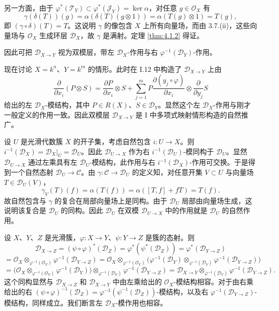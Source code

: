 另一方面，由于 $\varphi^*(\mathcal{T}_Y)\subset\varphi^*(\mathcal{J}_Y)=\ker\alpha$，对任意 $g\in\mathcal{O}_X$ 有
$$\gamma(\delta(T))(g)=\alpha(\delta(T)(g\otimes 1))=\alpha(T(g)\otimes 1)=T(g),$$
即 $(\gamma\circ\delta)(T)=T$。这说明 $\gamma$ 的像包含 $X$ 上所有向量场，而由 3.7.(ii)，这些向量场与 $\mathcal{O}_X$ 生成环层 $\mathcal{D}_X$，故 $\gamma$ 是满射。定理 \ref{thm:4.1.2} 得证。

因此可把 $\mathcal{D}_{X\to Y}$ 视为双模层，带左 $\mathcal{D}_X$-作用与右 $\varphi^{-1}(\mathcal{D}_Y)$-作用。

现在讨论 $X=k^n$、$Y=k^m$ 的情形。此时在 I.12 中构造了 $\mathcal{D}_{X\to Y}$ 上由
$$\frac{\partial}{\partial x_i}(P\otimes S)=\frac{\partial P}{\partial x_i}\otimes S
+\sum_{j=1}^m P\frac{\partial(y_j\circ\varphi)}{\partial x_i}\otimes\frac{\partial}{\partial y_j}S$$
给出的左 $\mathcal{D}_X$-模结构，其中 $P\in R(X)$、$S\in\mathcal{D}_Y$。显然这个左 $\mathcal{D}_X$-作用与刚才一般定义的作用一致。因此双模层 $\mathcal{D}_{X\to Y}$ 是 I 中多项式映射情形构造的自然推广。

\begin{remark}\label{rem:4.1.6}
设 $U$ 是光滑代数簇 $X$ 的开子集，考虑自然包含 $i:U\to X$。则
$i^{-1}(\mathcal{D}_X)=\mathcal{D}_X|_U=\mathcal{D}_U$。因此 $\mathcal{D}_{U\to X}$ 作为右 $i^{-1}(\mathcal{D}_U)$-模同构于 $\mathcal{D}_U$。显然 $\mathcal{D}_{U\to X}$ 通过左乘具有左 $\mathcal{D}_U$-模结构，此作用与右 $i^{-1}(\mathcal{D}_X)$-作用可交换。于是得到一个自然态射 $\mathcal{D}_U\to\mathcal{C}$。由 $\gamma:\mathcal{C}\to\mathcal{D}_U$ 的定义知，对任意开集 $V\subset U$ 与向量场 $T\in\mathcal{D}_U(V)$，
$$\gamma_V(T)(f)=\alpha(T(f))=\alpha([T,f]+fT)=T(f).$$
故自然包含与 $\gamma$ 的复合在局部向量场上是同构。由于 $\mathcal{D}_U$ 局部由向量场生成，这说明该复合是 $\mathcal{D}_U$ 的同构。因此 $\mathcal{D}_U$ 在双模 $\mathcal{D}_{U\to X}$ 中的作用就是 $\mathcal{D}_U$ 的自然作用。
\end{remark}

设 $X$、$Y$、$Z$ 是光滑簇，$\varphi:X\to Y$、$\psi:Y\to Z$ 是簇的态射。则
$$\mathcal{D}_{X\to Z}=(\psi\circ\varphi)^*(\mathcal{D}_Z)=\varphi^*(\psi^*(\mathcal{D}_Z))
=\varphi^*(\mathcal{D}_{Y\to Z})$$
$$=\mathcal{O}_X\otimes_{\varphi^{-1}(\mathcal{O}_Y)}\varphi^{-1}(\mathcal{D}_{Y\to Z})
=\mathcal{O}_X\otimes_{\varphi^{-1}(\mathcal{O}_Y)}\bigl(\varphi^{-1}(\mathcal{D}_Y)
\otimes_{\varphi^{-1}(\mathcal{D}_Y)}\varphi^{-1}(\mathcal{D}_{Y\to Z})\bigr)$$
$$=\bigl(\mathcal{O}_X\otimes_{\varphi^{-1}(\mathcal{O}_Y)}\varphi^{-1}(\mathcal{D}_Y)\bigr)
\otimes_{\varphi^{-1}(\mathcal{D}_Y)}\varphi^{-1}(\mathcal{D}_{Y\to Z})
=\mathcal{D}_{X\to Y}\otimes_{\varphi^{-1}(\mathcal{D}_Y)}\varphi^{-1}(\mathcal{D}_{Y\to Z}).$$
这个同构显然与 $\mathcal{D}_{X\to Z}$ 和 $\mathcal{D}_{X\to Y}$ 中由左乘给出的 $\mathcal{O}_X$-模结构相容。对于由右乘给出的右
$(\psi\circ\varphi)^{-1}(\mathcal{D}_Z)=\varphi^{-1}(\psi^{-1}(\mathcal{D}_Z))$-模结构，以及右
$\varphi^{-1}(\mathcal{D}_{Y\to Z})$-模结构，同样成立。我们断言左 $\mathcal{D}_X$-模作用也相容。

